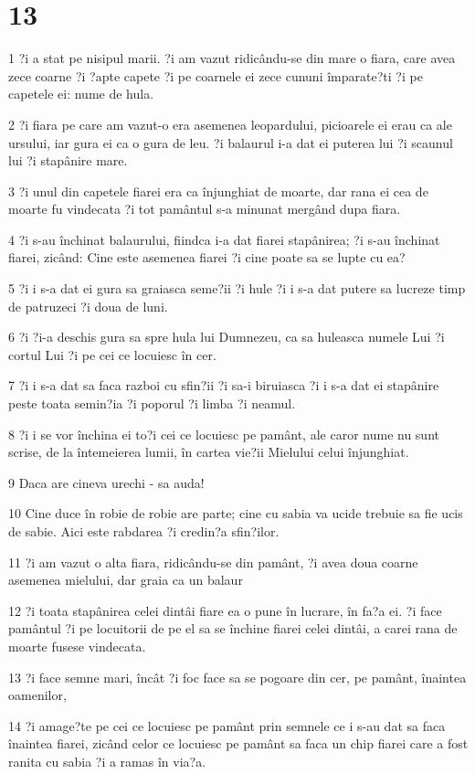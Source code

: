 \chapter{13}

\par 1 ?i a stat pe nisipul marii. ?i am vazut ridicându-se din mare o fiara, care avea zece coarne ?i ?apte capete ?i pe coarnele ei zece cununi împarate?ti ?i pe capetele ei: nume de hula.
\par 2 ?i fiara pe care am vazut-o era asemenea leopardului, picioarele ei erau ca ale ursului, iar gura ei ca o gura de leu. ?i balaurul i-a dat ei puterea lui ?i scaunul lui ?i stapânire mare.
\par 3 ?i unul din capetele fiarei era ca înjunghiat de moarte, dar rana ei cea de moarte fu vindecata ?i tot pamântul s-a minunat mergând dupa fiara.
\par 4 ?i s-au închinat balaurului, fiindca i-a dat fiarei stapânirea; ?i s-au închinat fiarei, zicând: Cine este asemenea fiarei ?i cine poate sa se lupte cu ea?
\par 5 ?i i s-a dat ei gura sa graiasca seme?ii ?i hule ?i i s-a dat putere sa lucreze timp de patruzeci ?i doua de luni.
\par 6 ?i ?i-a deschis gura sa spre hula lui Dumnezeu, ca sa huleasca numele Lui ?i cortul Lui ?i pe cei ce locuiesc în cer.
\par 7 ?i i s-a dat sa faca razboi cu sfin?ii ?i sa-i biruiasca ?i i s-a dat ei stapânire peste toata semin?ia ?i poporul ?i limba ?i neamul.
\par 8 ?i i se vor închina ei to?i cei ce locuiesc pe pamânt, ale caror nume nu sunt scrise, de la întemeierea lumii, în cartea vie?ii Mielului celui înjunghiat.
\par 9 Daca are cineva urechi - sa auda!
\par 10 Cine duce în robie de robie are parte; cine cu sabia va ucide trebuie sa fie ucis de sabie. Aici este rabdarea ?i credin?a sfin?ilor.
\par 11 ?i am vazut o alta fiara, ridicându-se din pamânt, ?i avea doua coarne asemenea mielului, dar graia ca un balaur
\par 12 ?i toata stapânirea celei dintâi fiare ea o pune în lucrare, în fa?a ei. ?i face pamântul ?i pe locuitorii de pe el sa se închine fiarei celei dintâi, a carei rana de moarte fusese vindecata.
\par 13 ?i face semne mari, încât ?i foc face sa se pogoare din cer, pe pamânt, înaintea oamenilor,
\par 14 ?i amage?te pe cei ce locuiesc pe pamânt prin semnele ce i s-au dat sa faca înaintea fiarei, zicând celor ce locuiesc pe pamânt sa faca un chip fiarei care a fost ranita cu sabia ?i a ramas în via?a.
